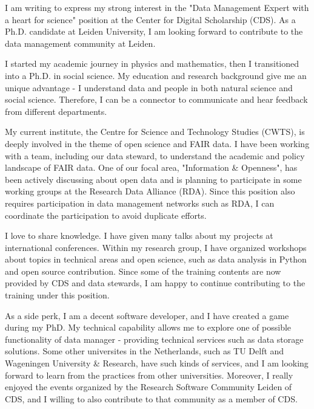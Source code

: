 \documentclass[11pt, a4paper]{awesome-cv}
\begin{document}
\makecvheader[R]

\makecvfooter
  {}%
  {}%
  {}

\makelettertitle

\begin{cvletter}

I am writing to express my strong interest in the "Data Management Expert with a heart for science" position at the Center for Digital Scholarship (CDS). As a Ph.D. candidate at Leiden University, I am looking forward to contribute to the data management community at Leiden.

I started my academic journey in physics and mathematics, then I transitioned into a Ph.D. in social science. My education and research background give me an unique advantage - I understand data and people in both natural science and social science. Therefore, I can be a connector to communicate and hear feedback from different departments.

My current institute, the Centre for Science and Technology Studies (CWTS), is deeply involved in the theme of open science and FAIR data. I have been working with a team, including our data steward, to understand the academic and policy landscape of FAIR data. One of our focal area, "Information \& Openness", has been actively discussing about open data and is planning to participate in some working groups at the Research Data Alliance (RDA). Since this position also requires participation in data management networks such as RDA, I can coordinate the participation to avoid duplicate efforts.

I love to share knowledge. I have given many talks about my projects at international conferences. Within my research group, I have organized workshops about topics in technical areas and open science, such as data analysis in Python and open source contribution. Since some of the training contents are now provided by CDS and data stewards, I am happy to continue contributing to the training under this position.

As a side perk, I am a decent software developer, and I have created a game during my PhD. My technical capability allows me to explore one of possible functionality of data manager - providing technical services such as data storage solutions. Some other universites in the Netherlands, such as TU Delft and Wageningen University \& Research, have such kinds of services, and I am looking forward to learn from the practices from other universities. Moreover, I really enjoyed the events organized by the Research Software Community Leiden of CDS, and I willing to also contribute to that community as a member of CDS.


\end{cvletter}
\end{document}
